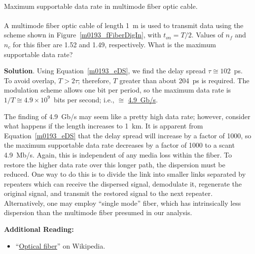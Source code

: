 ~\\ \begin{example} 
\begin{mdframed}[backgroundcolor=brown!20,linecolor=brown!20]\raggedright
Maximum supportable data rate in multimode fiber optic cable.
\\~\\  
A multimode fiber optic cable of length 1~m is used to transmit data using the scheme shown in Figure~\ref{m0193_fFiberDigIn}, with $t_{on}=T/2$.
Values of $n_f$ and $n_c$ for this fiber are 1.52 and 1.49, respectively.
What is the maximum supportable data rate?

{\bf Solution}. 
Using Equation~\ref{m0193_eDS}, we find the delay spread $\tau\cong 102$~ps.
To avoid overlap, $T>2\tau$; therefore, $T$ greater than about 204~ps is required.
The modulation scheme allows one bit per period, so the maximum data rate is $1/T\cong 4.9\times 10^9$~bits per second; i.e., $\cong$ \underline{4.9~Gb/s}.
\end{mdframed}
\end{example}

The finding of 4.9~Gb/s may seem like a pretty high data rate; however, consider what happens if the length increases to 1~km.  It is apparent from Equation~\ref{m0193_eDS} that the delay spread will increase by a factor of 1000, so the maximum supportable data rate decreases by a factor of 1000 to a scant 4.9~Mb/s.
Again, this is independent of any media loss within the fiber.
To restore the higher data rate over this longer path, the dispersion must be reduced.
One way to do this is to divide the link into smaller links separated by repeaters which can receive the dispersed signal, demodulate it, regenerate the original signal, and transmit the restored signal to the next repeater.
Alternatively, one may employ ``single mode'' fiber, which has intrinsically less dispersion than the multimode fiber presumed in our analysis.


{\bf Additional Reading:}
\begin{itemize}
\item ``\href{https://en.wikipedia.org/wiki/Optical_fiber}{Optical fiber}'' on Wikipedia.
\end{itemize}



